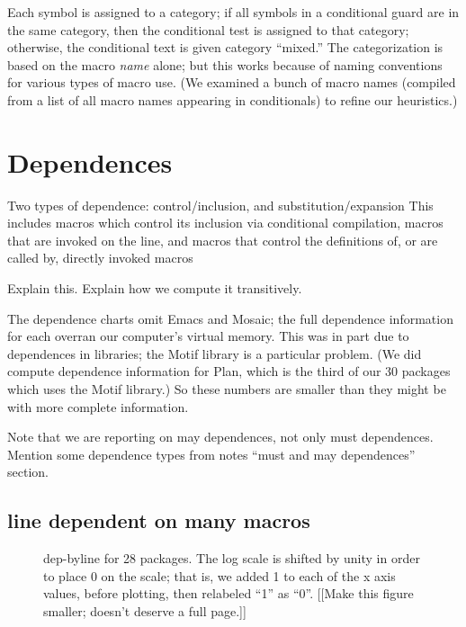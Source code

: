 \documentclass[10pt]{article}
\begin{document}
      Each symbol is assigned to a category; if all symbols in a
      conditional guard are in the same category, then the conditional test
      is assigned to that category; otherwise, the conditional text is
      given category ``mixed.''  The categorization is based on the macro
      {\em name} alone; but this works because of naming conventions for
      various types of macro use.  (We examined a bunch of macro names
      (compiled from a list of all macro names appearing in conditionals)
      to refine our heuristics.)


{}


\section{Dependences}
\label{sec:dependence}
\label{sec:last-content-section}

 Two types of dependence:  control/inclusion, and substitution/expansion
     This includes macros which control its inclusion via conditional
     compilation, macros that are invoked on the line, and macros that
     control the definitions of, or are called by, directly invoked macros

 Explain this.  Explain how we compute it transitively.
 
 The dependence charts omit Emacs and Mosaic; the full dependence
 information for each overran our computer's virtual memory.  This was in
 part due to dependences in libraries; the Motif library is a particular
 problem.  (We did compute dependence information for Plan, which is the
 third of our 30 packages which uses the Motif library.)  So these numbers
 are smaller than they might be with more complete information.

Note that we are reporting on may dependences, not only must dependences.
Mention some dependence types from notes ``must and may dependences'' section.

\subsection{line dependent on many macros}

\begin{figure}
\centerline{}
\caption{dep-byline for 28 packages.
The log scale is shifted by unity in order to place 0 on the scale; that
is, we added 1 to each of the x axis values, before plotting, then
relabeled ``1'' as ``0''.
[[Make this figure smaller; doesn't deserve a full page.]]}
\label{fig:dep-byline}
\end{figure}
\end{document}
